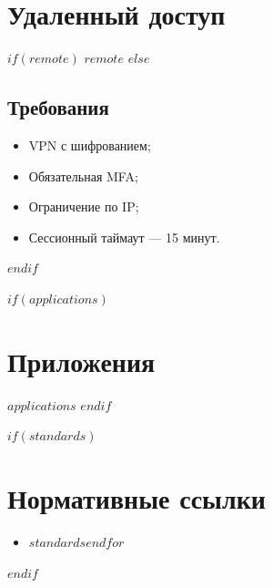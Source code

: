 \documentclass[14pt,a4paper]{extarticle}
\begin{document}
\section{Удаленный доступ}
\label{sec:remote}

$if(remote)$
$remote$
$else$
\subsection{Требования}
\begin{itemize}
    \item VPN с шифрованием;
    \item Обязательная MFA;
    \item Ограничение по IP;
    \item Сессионный таймаут — 15 минут.
\end{itemize}
$endif$

$if(applications)$
\newpage
\appendix
\section*{Приложения}
$applications$
$endif$

$if(standards)$
\newpage
\section*{Нормативные ссылки}
\begin{itemize}
$for(standards)$\item $standards$$endfor$
\end{itemize}
$endif$
\end{document}
